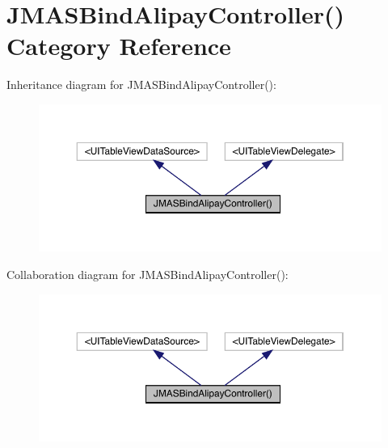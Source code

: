 \hypertarget{category_j_m_a_s_bind_alipay_controller_07_08}{}\section{J\+M\+A\+S\+Bind\+Alipay\+Controller() Category Reference}
\label{category_j_m_a_s_bind_alipay_controller_07_08}


Inheritance diagram for J\+M\+A\+S\+Bind\+Alipay\+Controller()\+:\nopagebreak
\begin{figure}[H]
\begin{center}
\leavevmode
\includegraphics[width=350pt]{category_j_m_a_s_bind_alipay_controller_07_08__inherit__graph}
\end{center}
\end{figure}


Collaboration diagram for J\+M\+A\+S\+Bind\+Alipay\+Controller()\+:\nopagebreak
\begin{figure}[H]
\begin{center}
\leavevmode
\includegraphics[width=350pt]{category_j_m_a_s_bind_alipay_controller_07_08__coll__graph}
\end{center}
\end{figure}
